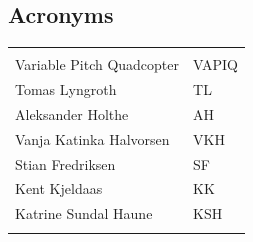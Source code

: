 \documentclass{article}
\begin{document}
\vspace*{3.0 cm}

\begin{center}
\section*{\textbf{Acronyms}}
\begin{tabular}{ll}
\rowcolor{cadetgrey}
    &   \\
Variable Pitch Quadcopter   & VAPIQ \\\rowcolor{gainsboro}
Tomas Lyngroth       & TL          \\ 
Aleksander Holthe      & AH          \\\rowcolor{gainsboro}
Vanja Katinka Halvorsen     & VKH   \\
Stian Fredriksen      & SF          \\\rowcolor{gainsboro}
Kent Kjeldaas       & KK            \\
Katrine Sundal Haune    & KSH       \\\rowcolor{gainsboro}
\end{tabular}                                                                   
\end{center}

\newpage






\tableofcontents
\newpage


\newpage


\newpage


\newpage



%

%

%




\newpage
\end{document}
